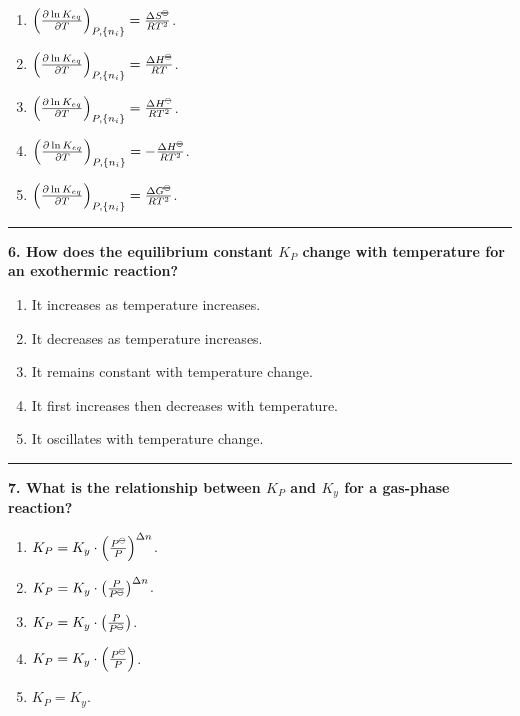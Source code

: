 \documentclass[
  9pt,
]{extbook}
\providecommand{\tightlist}{%
  \setlength{\itemsep}{0pt}\setlength{\parskip}{0pt}}
\theoremstyle{definition}
\theoremstyle{definition}
\theoremstyle{definition}
\theoremstyle{definition}
\theoremstyle{remark}
\begin{document}
\begin{enumerate}
\def\labelenumi{\alph{enumi}.}
\tightlist
\item
  \(\left(\frac{\partial \ln K_{eq}}{\partial T}\right)_{P,\{n_i\}} = \frac{\Delta S^{{-\kern-6pt{\ominus}\kern-6pt-}}}{RT^2}\).
\item
  \(\left(\frac{\partial \ln K_{eq}}{\partial T}\right)_{P,\{n_i\}} = \frac{\Delta H^{{-\kern-6pt{\ominus}\kern-6pt-}}}{RT}\).
\item
  \(\left(\frac{\partial \ln K_{eq}}{\partial T}\right)_{P,\{n_i\}} = \frac{\Delta H^{{-\kern-6pt{\ominus}\kern-6pt-}}}{RT^2}\).
\item
  \(\left(\frac{\partial \ln K_{eq}}{\partial T}\right)_{P,\{n_i\}} = -\frac{\Delta H^{{-\kern-6pt{\ominus}\kern-6pt-}}}{RT^2}\).
\item
  \(\left(\frac{\partial \ln K_{eq}}{\partial T}\right)_{P,\{n_i\}} = \frac{\Delta G^{{-\kern-6pt{\ominus}\kern-6pt-}}}{RT^2}\).
\end{enumerate}

\begin{center}\rule{0.5\linewidth}{0.5pt}\end{center}

\textbf{6. How does the equilibrium constant \(K_P\) change with temperature for an exothermic reaction?}

\begin{enumerate}
\def\labelenumi{\alph{enumi}.}
\tightlist
\item
  It increases as temperature increases.
\item
  It decreases as temperature increases.
\item
  It remains constant with temperature change.
\item
  It first increases then decreases with temperature.
\item
  It oscillates with temperature change.
\end{enumerate}

\begin{center}\rule{0.5\linewidth}{0.5pt}\end{center}

\textbf{7. What is the relationship between \(K_P\) and \(K_y\) for a gas-phase reaction?}

\begin{enumerate}
\def\labelenumi{\alph{enumi}.}
\tightlist
\item
  \(K_P = K_y \cdot \left(\frac{P^{{-\kern-6pt{\ominus}\kern-6pt-}}}{P}\right)^{\Delta n}\).
\item
  \(K_P = K_y \cdot \left(\frac{P}{P^{{-\kern-6pt{\ominus}\kern-6pt-}}}\right)^{\Delta n}\).
\item
  \(K_P = K_y \cdot \left(\frac{P}{P^{{-\kern-6pt{\ominus}\kern-6pt-}}}\right)\).
\item
  \(K_P = K_y \cdot \left(\frac{P^{{-\kern-6pt{\ominus}\kern-6pt-}}}{P}\right)\).
\item
  \(K_P = K_y\).
\end{enumerate}
\end{document}
